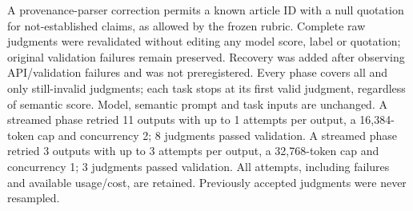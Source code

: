 A provenance-parser correction permits a known article ID with a null quotation for not-established claims, as allowed by the frozen rubric. Complete raw judgments were revalidated without editing any model score, label or quotation; original validation failures remain preserved.
Recovery was added after observing API/validation failures and was not preregistered. Every phase covers all and only still-invalid judgments; each task stops at its first valid judgment, regardless of semantic score. Model, semantic prompt and task inputs are unchanged. A streamed phase retried 11 outputs with up to 1 attempts per output, a 16,384-token cap and concurrency 2; 8 judgments passed validation. A streamed phase retried 3 outputs with up to 3 attempts per output, a 32,768-token cap and concurrency 1; 3 judgments passed validation. All attempts, including failures and available usage/cost, are retained. Previously accepted judgments were never resampled.
